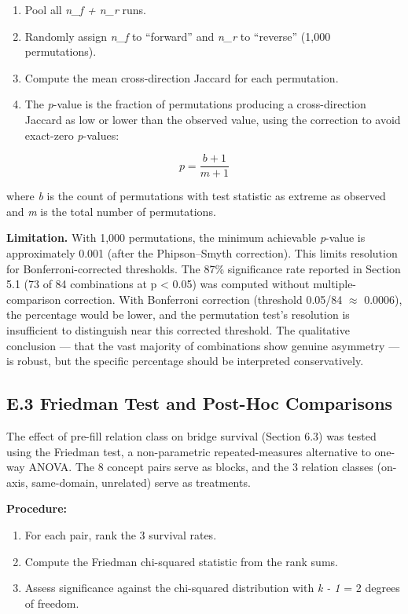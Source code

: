 \begin{enumerate}
\def\labelenumi{\arabic{enumi}.}
\tightlist
\item
  Pool all \emph{n\_f + n\_r} runs.
\item
  Randomly assign \emph{n\_f} to ``forward'' and \emph{n\_r} to ``reverse'' (1,000 permutations).
\item
  Compute the mean cross-direction Jaccard for each permutation.
\item
  The \emph{p}-value is the fraction of permutations producing a cross-direction Jaccard as low or lower than the observed value, using the \citet{phipson2010permutation} correction to avoid exact-zero \emph{p}-values:
\end{enumerate}

\[p = \frac{b + 1}{m + 1}\]

where \emph{b} is the count of permutations with test statistic as extreme as observed and \emph{m} is the total number of permutations.

\textbf{Limitation.} With 1,000 permutations, the minimum achievable \emph{p}-value is approximately 0.001 (after the Phipson--Smyth correction). This limits resolution for Bonferroni-corrected thresholds. The 87\% significance rate reported in Section 5.1 (73 of 84 combinations at p \textless{} 0.05) was computed without multiple-comparison correction. With Bonferroni correction (threshold 0.05/84 \(\approx\) 0.0006), the percentage would be lower, and the permutation test's resolution is insufficient to distinguish near this corrected threshold. The qualitative conclusion --- that the vast majority of combinations show genuine asymmetry --- is robust, but the specific percentage should be interpreted conservatively.

\subsection{E.3 Friedman Test and Post-Hoc Comparisons}\label{e.3-friedman-test-and-post-hoc-comparisons}

The effect of pre-fill relation class on bridge survival (Section 6.3) was tested using the Friedman test, a non-parametric repeated-measures alternative to one-way ANOVA. The 8 concept pairs serve as blocks, and the 3 relation classes (on-axis, same-domain, unrelated) serve as treatments.

\textbf{Procedure:}

\begin{enumerate}
\def\labelenumi{\arabic{enumi}.}
\tightlist
\item
  For each pair, rank the 3 survival rates.
\item
  Compute the Friedman chi-squared statistic from the rank sums.
\item
  Assess significance against the chi-squared distribution with \emph{k - 1} = 2 degrees of freedom.
\end{enumerate}

